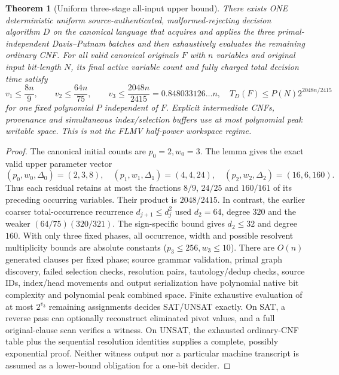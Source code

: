 \documentclass[11pt]{article}
\newtheorem{theorem}{Theorem}
\begin{document}
\begin{theorem}[Uniform three-stage all-input upper bound]
There exists ONE deterministic uniform source-authenticated, malformed-rejecting decision algorithm $D$ on the canonical language that acquires and applies the three primal-independent Davis--Putnam batches and then exhaustively evaluates the remaining ordinary CNF. For all valid canonical originals $F$ with $n$ variables and original input bit-length $N$, its final active variable count and fully charged total decision time satisfy
\[
 v_1\le\frac{8n}{9},\qquad v_2\le\frac{64n}{75},\qquad
 \boxed{v_3\le\frac{2048n}{2415}=0.848033126\ldots n},\quad
 \boxed{T_D(F)\le P(N)2^{2048n/2415}}
\]
for one fixed polynomial $P$ independent of $F$. Explicit intermediate CNFs, provenance and simultaneous index/selection buffers use at most polynomial peak writable space. This is \emph{not} the FLMV half-power workspace regime.
\end{theorem}
\begin{proof}
The canonical initial counts are $p_0=2,w_0=3$. The lemma gives the exact valid upper parameter vector
\[
 (p_0,w_0,\Delta_0)=(2,3,8),\quad
 (p_1,w_1,\Delta_1)=(4,4,24),\quad
 (p_2,w_2,\Delta_2)=(16,6,160).
\]
Thus each residual retains at most the fractions $8/9$, $24/25$ and $160/161$ of its preceding occurring variables. Their product is $2048/2415$. In contrast, the earlier coarser total-occurrence recurrence $d_{j+1}\le d_j^2$ used $d_2=64$, degree $320$ and the weaker $(64/75)(320/321)$. The sign-specific bound gives $d_2\le32$ and degree $160$. With only three fixed phases, all occurrence, width and possible resolvent multiplicity bounds are absolute constants ($p_3\le256,w_3\le10$). There are $O(n)$ generated clauses per fixed phase; source grammar validation, primal graph discovery, failed selection checks, resolution pairs, tautology/dedup checks, source IDs, index/head movements and output serialization have polynomial native bit complexity and polynomial peak combined space. Finite exhaustive evaluation of at most $2^{v_3}$ remaining assignments decides SAT/UNSAT exactly. On SAT, a reverse pass can optionally reconstruct eliminated pivot values, and a full original-clause scan verifies a witness. On UNSAT, the exhausted ordinary-CNF table plus the sequential resolution identities supplies a complete, possibly exponential proof. Neither witness output nor a particular machine transcript is assumed as a lower-bound obligation for a one-bit decider.\end{proof}
\end{document}
